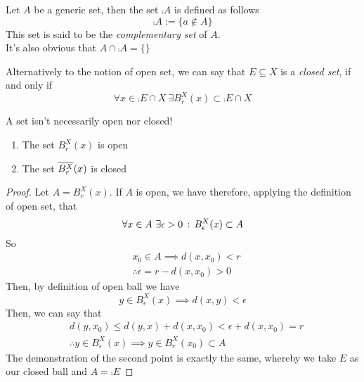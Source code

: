 \documentclass[../complete.tex]{subfiles}
\begin{document}
\begin{dfn}
	Let $A$ be a generic set, then the set $\comp{A}$ is defined as follows
	\begin{equation}
		\comp{A}:=\{a\notin A\}
		\label{eq:compsetdef}
	\end{equation}
	This set is said to be the \textit{complementary set} of $A$.\\
	It's also obvious that $A\cap\comp{A}=\{\}$
\end{dfn}
\begin{dfn}
	Alternatively to the notion of open set, we can say that $E\subseteq X$ is a \textit{closed set}, if and only if
	\begin{equation}
		\forall x\in\comp{E}\cap X\ \exists B_r^X(x)\subset\comp{E}\cap X
		\label{eq:closedsetdef}
	\end{equation}
\end{dfn}
\begin{rmk}
	A set isn't necessarily open nor closed!
\end{rmk}
\begin{prop}
	\begin{enumerate}
	\item The set $B_r^X(x)$ is open
	\item The set $\overline{B_r^X}(x)$ is closed
	\end{enumerate}
\end{prop}
\begin{proof}
	Let $A=B_r^X(x)$. If $A$ is open, we have therefore, applying the definition of open set, that
	\begin{equation*}
		\forall x\in A\ \exists\epsilon>0\, :\,  B^X_\epsilon(x)\subset A
	\end{equation*}
	So
	\begin{equation*}
		\begin{aligned}
			&x_0\in A\implies d(x,x_0)<r\\
			&\therefore\epsilon=r-d(x,x_0)>0
		\end{aligned}
	\end{equation*}
	Then, by definition of open ball we have
	\begin{equation*}
		y\in B^X_\epsilon(x)\implies d(x,y)<\epsilon
	\end{equation*}
	Then, we can say that
	\begin{equation*}
		\begin{aligned}
			&d(y,x_0)\le d(y,x)+d(x,x_0)<\epsilon+d(x,x_0)=r\\
			&\therefore y\in B^X_\epsilon(x)\implies y\in B^X_r(x_0)\subset A
		\end{aligned}
	\end{equation*}
	The demonstration of the second point is exactly the same, whereby we take $E$ as our closed ball and $A=\comp{E}$
\end{proof}
\end{document}
